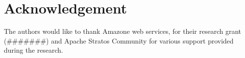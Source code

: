 \section{Acknowledgement}

The authors would like to thank Amazone web services, for their research grant (#######) and Apache Stratos Community for various support provided during the research.




